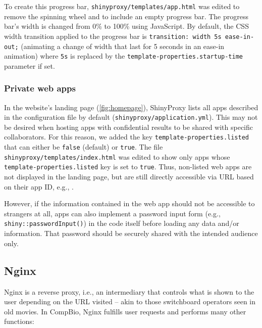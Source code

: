 To create this progress bar, \verb|shinyproxy/templates/app.html| was edited to remove the spinning wheel and to include an empty progress bar. The progress bar's width is changed from 0\% to 100\% using JavaScript. By default, the CSS width transition applied to the progress bar is \texttt{transition: width 5s ease-in-out;} (animating a change of width that last for 5 seconds in an ease-in animation) where \texttt{5s} is replaced by the \texttt{template-properties.startup-time} parameter if set.



\subsubsection{Private web apps}

In the website's landing page (\autoref{fig:homepage}), ShinyProxy lists all apps described in the configuration file by default (\texttt{shinyproxy/application.yml}). This may not be desired when hosting apps with confidential results to be shared with specific collaborators. For this reason, we added the key \texttt{template-properties.listed} that can either be \texttt{false} (default) or \texttt{true}. The file \texttt{shinyproxy/templates/index.html} was edited to show only apps whose \texttt{template-properties.listed} key is set to \texttt{true}. Thus, non-listed web apps are not displayed in the landing page, but are still directly accessible via URL based on their app ID, e.g., .

However, if the information contained in the web app should not be accessible to strangers at all, apps can also implement a password input form (e.g., \texttt{shiny::passwordInput()}) in the code itself before loading any data and/or information. That password should be securely shared with the intended audience only.

\subsection{Nginx}

Nginx is a reverse proxy, i.e., an intermediary that controls what is shown to the user depending on the URL visited -- akin to those switchboard operators seen in old movies. In CompBio, Nginx fulfills user requests and performs many other functions:

